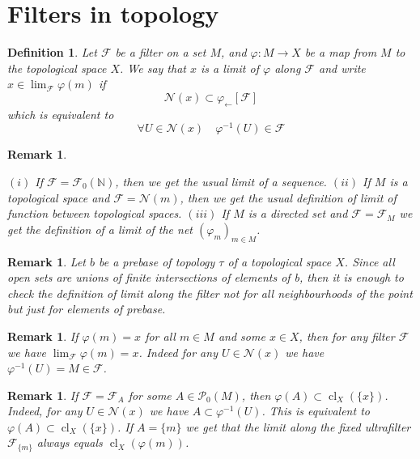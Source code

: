 \documentclass[12pt]{article}
\newtheorem{remark}[theorem]{Remark}
\newtheorem{definition}[theorem]{Definition}
\begin{document}
\section{Filters in topology}

\begin{definition}\label{DefLimitAlongFilter} Let $\mathcal{F}$ be a filter on a
    set $M$, and $\varphi:M\to X$ be a map from $M$ to the topological space
    $X$. We say that $x$ is a limit of $\varphi$ along $\mathcal{F}$ and write
    $x\in\lim_{\mathcal{F}} \varphi(m)$ if
    $$
        \mathcal{N}(x)\subset \varphi_{\leftarrow}[\mathcal{F}]
    $$
    which is equivalent to
    $$
        \forall U\in\mathcal{N}(x)\quad \varphi^{-1}(U)\in\mathcal{F}
    $$
\end{definition}

\begin{remark}\label{RemReductionFromLimitAlongFilter}

    $(i)$ If $\mathcal{F}=\mathcal{F}_0(\mathbb{N})$, then we get the usual
    limit of a sequence. $(ii)$ If $M$ is a topological space and
    $\mathcal{F}=\mathcal{N}(m)$, then we get the usual definition of limit of
    function between topological spaces. $(iii)$ If $M$ is a directed set and
    $\mathcal{F}=\mathcal{F}_M$ we get the definition of a limit of the net
    ${(\varphi_m)}_{m\in M}$.
\end{remark}

\begin{remark}\label{RemOnCheckingTheDefinitionOfLimit} Let $b$ be a prebase of
    topology $\tau$ of a topological space $X$. Since all open sets are unions
    of finite intersections of elements of b, then it is enough to check the
    definition of limit along the filter not for all neighbourhoods of the point
    but just for elements of prebase.
\end{remark}

\begin{remark}\label{RemLimitOfAConst} If $\varphi(m)=x$ for all $m\in M$ and
    some $x\in X$, then for any filter $\mathcal{F}$ we have
    $\lim_{\mathcal{F}}\varphi(m)=x$. Indeed for any $U\in\mathcal{N}(x)$ we
    have $\varphi^{-1}(U)=M\in\mathcal{F}$.
\end{remark}

\begin{remark}\label{RemLimitAlongFilterGeneratedByASet} If
    $\mathcal{F}=\mathcal{F}_A$ for some $A\in\mathcal{P}_0(M)$, then
    $\varphi(A)\subset \operatorname{cl}_X(\{x\})$. Indeed, for any
    $U\in\mathcal{N}(x)$ we have $A\subset\varphi^{-1}(U)$. This is equivalent
    to $\varphi(A)\subset\operatorname{cl}_X(\{x\})$. If $A=\{m\}$ we get that
    the limit along the fixed ultrafilter $\mathcal{F}_{\{m\}}$ always equals
    $\operatorname{cl}_X(\varphi(m))$.
\end{remark}
\end{document}
